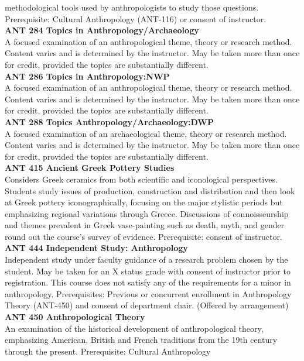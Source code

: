 \documentclass[
  letterpaper,
]{scrbook}
\begin{document}
methodological tools used by anthropologists to study those questions.
Prerequisite: Cultural Anthropology (ANT-116) or consent of
instructor.\\
\textbf{ANT 284 Topics in Anthropology/Archaeology}\\
A focused examination of an anthropological theme, theory or research
method. Content varies and is determined by the instructor. May be taken
more than once for credit, provided the topics are substantially
different.\\
\textbf{ANT 286 Topics in Anthropology:NWP}\\
A focused examination of an anthropological theme, theory or research
method. Content varies and is determined by the instructor. May be taken
more than once for credit, provided the topics are substantially
different.\\
\textbf{ANT 288 Topics Anthropology/Archaeology:DWP}\\
A focused examination of an archaeological theme, theory or research
method. Content varies and is determined by the instructor. May be taken
more than once for credit, provided the topics are substantially
different.\\
\textbf{ANT 415 Ancient Greek Pottery Studies}\\
Considers Greek ceramics from both scientific and iconological
perspectives. Students study issues of production, construction and
distribution and then look at Greek pottery iconographically, focusing
on the major stylistic periods but emphasizing regional variations
through Greece. Discussions of connoisseurship and themes prevalent in
Greek vase-painting such as death, myth, and gender round out the
course's survey of evidence. Prerequisite: consent of instructor.\\
\textbf{ANT 444 Independent Study: Anthropology}\\
Independent study under faculty guidance of a research problem chosen by
the student. May be taken for an X status grade with consent of
instructor prior to registration. This course does not satisfy any of
the requirements for a minor in anthropology. Prerequisites: Previous or
concurrent enrollment in Anthropology Theory (ANT-450) and consent of
department chair. (Offered by arrangement)\\
\textbf{ANT 450 Anthropological Theory}\\
An examination of the historical development of anthropological theory,
emphasizing American, British and French traditions from the 19th
century through the present. Prerequisite: Cultural Anthropology
\end{document}
